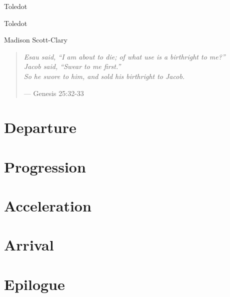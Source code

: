 \documentclass[11pt]{memoir}
\begin{document}
  \frontmatter

  \thispagestyle{empty}
  \null
  \vfill
  \begin{flushright}
    \DisplayFont Toledot
  \end{flushright}
  \vfill
  \cleardoublepage

  \pagestyle{plain}

  \doublespacing

  \begin{flushright}
    \null
    \vfill
    {\Huge\DisplayFont Toledot}

    \vfill

    {\Large\DisplayFont Madison Scott-Clary}
  \end{flushright}
  \thispagestyle{empty}

  \newpage

  

  \newpage
  \null
  \cleardoublepage



  \mainmatter

  \pagestyle{ourbook}

  \cleardoublepage
  \null
  \thispagestyle{empty}
  \vfill
  \begin{quote}
    \small
    \emph{Esau said, ``I am about to die; of what use is a birthright to me?'' \\
    Jacob said, ``Swear to me first.'' \\
    So he swore to him, and sold his birthright to Jacob.}

    --- Genesis 25:32-33
  \end{quote}
  \vfill

  \part{Departure}
  

  \part{Progression}
  

  \part{Acceleration}
  

  \part{Arrival}
  

  \part*{Epilogue}
  

  \backmatter

  \markboth{}{}


\end{document}
